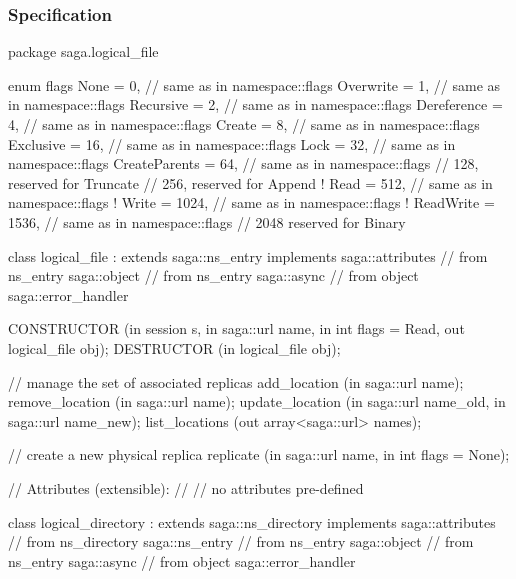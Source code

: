  \subsubsection{Specification}
 
 \begin{myspec}
  package saga.logical_file
  {
    enum flags
    {
      None            =    0, // same as in namespace::flags
      Overwrite       =    1, // same as in namespace::flags
      Recursive       =    2, // same as in namespace::flags
      Dereference     =    4, // same as in namespace::flags
      Create          =    8, // same as in namespace::flags
      Exclusive       =   16, // same as in namespace::flags
      Lock            =   32, // same as in namespace::flags
      CreateParents   =   64, // same as in namespace::flags
      //                 128,    reserved for Truncate
      //                 256,    reserved for Append
!     Read            =  512, // same as in namespace::flags 
!     Write           = 1024, // same as in namespace::flags 
!     ReadWrite       = 1536, // same as in namespace::flags 
      //                2048     reserved for Binary
    }
 
 
    class logical_file : extends        saga::ns_entry
                         implements     saga::attributes
                      // from ns_entry  saga::object
                      // from ns_entry  saga::async
                      // from object    saga::error_handler
    {
      CONSTRUCTOR     (in  session             s,
                       in  saga::url           name,
                       in  int                 flags = Read,
                       out logical_file        obj);
      DESTRUCTOR      (in  logical_file        obj);
 
 
      // manage the set of associated replicas
      add_location    (in  saga::url           name);
      remove_location (in  saga::url           name);
      update_location (in  saga::url           name_old,
                       in  saga::url           name_new);
      list_locations  (out array<saga::url>    names);
 
      // create a new physical replica
      replicate       (in  saga::url           name, 
                       in  int                 flags = None);
 
      // Attributes (extensible):
      // 
      // no attributes pre-defined
    }
 
 
    class logical_directory : extends            saga::ns_directory
                              implements         saga::attributes
                           // from ns_directory  saga::ns_entry
                           // from ns_entry      saga::object
                           // from ns_entry      saga::async
                           // from object        saga::error_handler
    {
 
}}
\end{myspec}

